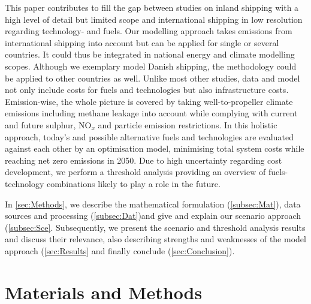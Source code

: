 \documentclass[article]{elsarticle}
\begin{document}
This paper contributes to fill the gap between studies on inland shipping  with a high level of detail but limited scope and international shipping in low resolution regarding technology- and fuels. Our modelling approach takes emissions from international shipping into account but can be applied for single or several countries. It could thus be integrated in national energy and climate modelling scopes. Although we exemplary model Danish shipping, the methodology could be applied to other countries as well.
Unlike most other studies, data and model not only include costs for fuels and technologies but also infrastructure costs. Emission-wise, the whole picture is covered by taking well-to-propeller climate emissions including methane leakage into account while complying with current and future sulphur, NO$_x$ and particle emission restrictions.
In this holistic approach, today's and possible alternative fuels and technologies are evaluated against each other by an optimisation model, minimising total system costs while reaching net zero emissions in 2050. Due to high uncertainty regarding cost development, we perform a threshold analysis providing an overview of fuels-technology combinations likely to play a role in the future.

In \autoref{sec:Methods}, we describe the mathematical formulation (\autoref{subsec:Mat}), data sources and processing (\autoref{subsec:Dat})and give and explain our scenario approach (\autoref{subsec:Sce}. Subsequently, we present the scenario and threshold analysis results and discuss their relevance, also describing strengths and weaknesses of the model approach (\autoref{sec:Results} and finally conclude (\autoref{sec:Conclusion}).  

\section{Materials and Methods}
\label{sec:Methods}
\end{document}
